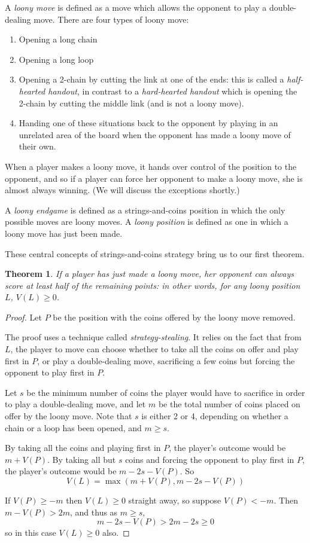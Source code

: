 \documentclass[a4paper,twocolumn]{article}
\newtheorem{sstealing}[thm]{Theorem}
\begin{document}
A \emph{loony move} is defined as a move which allows the opponent to
play a double-dealing move. There are four types of loony move:

\begin{enumerate}
  \item Opening a long chain
  \item Opening a long loop
  \item Opening a 2-chain by cutting the link at one of the ends:
    this is called a \emph{half-hearted handout}, in contrast to a
    \emph{hard-hearted handout} which is opening the 2-chain by
    cutting the middle link (and is not a loony move).
  \item Handing one of these situations back to the opponent by
    playing in an unrelated area of the board when the opponent has
    made a loony move of their own.
\end{enumerate}

When a player makes a loony move, it hands over control of the
position to the opponent, and so if a player can force her opponent to
make a loony move, she is almost always winning. (We will discuss the
exceptions shortly.)

A \emph{loony endgame} is defined as a strings-and-coins position in
which the only possible moves are loony moves. A \emph{loony position}
is defined as one in which a loony move has just been made.

These central concepts of strings-and-coins strategy bring us to our
first theorem.

\begin{sstealing}\label{sstealing}
  If a player has just made a loony move, her opponent can always
  score at least half of the remaining points: in other words, for any
  loony position $L$, $V(L) \ge 0$.
\end{sstealing}

\begin{proof}
  Let $P$ be the position with the coins offered by the loony move
  removed.

  The proof uses a technique called \emph{strategy-stealing}. It
  relies on the fact that from $L$, the player to move can choose
  whether to take all the coins on offer and play first in $P$, or
  play a double-dealing move, sacrificing a few coins but forcing the
  opponent to play first in $P$.

  Let $s$ be the minimum number of coins the player would have to
  sacrifice in order to play a double-dealing move, and let $m$ be the
  total number of coins placed on offer by the loony move. Note that
  $s$ is either 2 or 4, depending on whether a chain or a loop has
  been opened, and $m \ge s$.

  By taking all the coins and playing first in $P$, the player's
  outcome would be $m + V(P)$. By taking all but $s$ coins and forcing
  the opponent to play first in $P$, the player's outcome would be
  $m-2s-V(P)$. So $$V(L) = \max(m+V(P), m-2s-V(P))$$

  If $V(P) \ge -m$ then $V(L) \ge 0$ straight away, so suppose $V(P) <
  -m$. Then $m-V(P) > 2m$, and thus as $m \ge s$, $$m-2s-V(P) > 2m-2s
  \ge 0$$ so in this case $V(L) \ge 0$ also.
\end{proof}
\end{document}

